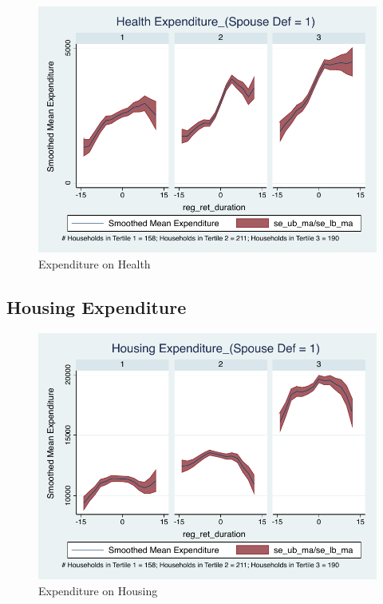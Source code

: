 \documentclass[a4paper]{article}
\begin{document}
\begin{figure}[h]
	\caption{Expenditure on Health}
	\centering
	\includegraphics[width=1.0\textwidth]{../ConsumptionPostRetirement_by_SpouseDef_Cats/Smoothed/1/spouse_def_total_healthexpense_real.pdf}
\end{figure}
\clearpage

\subsection{Housing Expenditure}
\begin{table}[h]
	\centering
	
\end{table}

\begin{figure}[h]
	\caption{Expenditure on Housing}
	\centering
	\includegraphics[width=1.0\textwidth]{../ConsumptionPostRetirement_by_SpouseDef_Cats/Smoothed/1/spouse_def_total_housing_real.pdf}
\end{figure}
\clearpage
\end{document}
